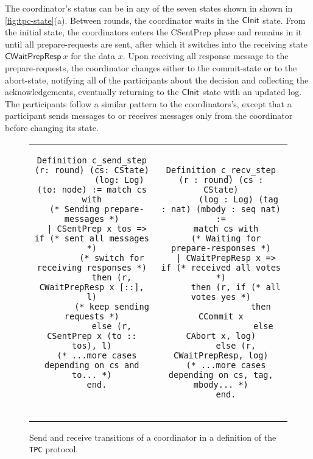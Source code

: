 The coordinator's status can be in any of the seven states shown in
shown in \cref{fig:tpc-state}(a).
%
Between rounds, the coordinator waits in the $\mathsf{CInit}$ state.
%
From the initial state, the coordinators enters the \textsf{CSentPrep}
phase and remains in it until all prepare-requests are sent, after
which it switches into the receiving state $\mathsf{CWaitPrepResp}~x$
for the data $x$.
%
Upon receiving all response message to the prepare-requests, the
coordinator changes either to the commit-state or to the abort-state,
notifying all of the participants about the decision and collecting
the acknowledgements, eventually returning to the $\mathsf{CInit}$ state with
an updated log.
%
The participants follow a similar pattern to the coordinators's,
except that a participant sends messages to or receives messages only
from the coordinator before changing its state.

{
\begin{figure}[t!]
\setlength{\belowcaptionskip}{-10pt}
{\centering
\begin{tabular}{c@{\ }c}
\begin{minipage}{0.5\linewidth}
\begin{lstlisting}[basicstyle=\scriptsize\ttfamily]
Definition c_send_step (r: round) (cs: CState)
           (log: Log) (to: node) := match cs with
  (* Sending prepare-messages *)
  | CSentPrep x tos => if (* sent all messages *)
        (* switch for receiving responses *)
        then (r, CWaitPrepResp x [::], l)
        (* keep sending requests *)
        else (r, CSentPrep x (to :: tos), l)
  (* ...more cases depending on cs and to... *)
  end.



\end{lstlisting}
\end{minipage}
&
\begin{minipage}{0.5\linewidth}
\begin{lstlisting}[basicstyle=\scriptsize\ttfamily]
Definition c_recv_step (r : round) (cs : CState)
       (log : Log) (tag : nat) (mbody : seq nat) :=
  match cs with
  (* Waiting for prepare-responses *)
  | CWaitPrepResp x => if (* received all votes *)
      then (r, if (* all votes yes *)
                then CCommit x
	             else CAbort x, log)
      else (r, CWaitPrepResp, log)
  (* ...more cases depending on cs, tag, mbody... *)
  end.
\end{lstlisting}
\vspace{-8pt}
\end{minipage}
\end{tabular}
}
\caption{Send and receive transitions of a coordinator in a \disel
  definition of the {\small\texttt{{TPC}}} protocol.}
\label{fig:coordinator-trans}
\end{figure}
}

